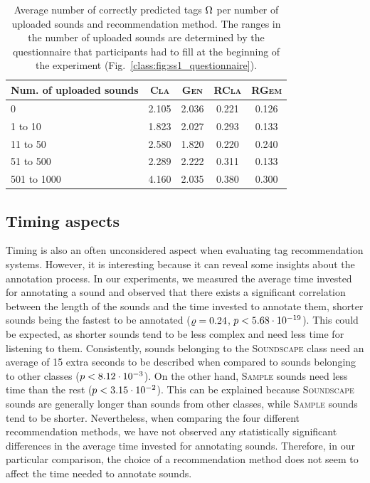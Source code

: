 \begin{table}
\footnotesize
  \begin{center}
\footnotesize
\begin{tabular}{l@{\hskip 1.0cm}cccc}
	\toprule
	 \textbf{Num. of uploaded sounds}	&  \textsc{Cla} & \textsc{Gen} & \textsc{RCla} & \textsc{RGem}  \\ 
	 \midrule
	  0 & 2.105 & 2.036 & 0.221 & 0.126 \\
	  1 to 10 & 1.823 & 2.027 & 0.293 & 0.133 \\
	  11 to 50 & 2.580 & 1.820 & 0.220 & 0.240 \\
	  51 to 500 & 2.289 & 2.222 & 0.311 & 0.133 \\
	  501 to 1000 & 4.160 & 2.035 & 0.380 & 0.300 \\ 
	  \bottomrule

\end{tabular}
\end{center}
\caption[Average number of correctly predicted tags per number of uploaded sounds and recommendation method]{Average number of correctly predicted tags $\Omega$ per number of uploaded sounds and recommendation method. The ranges in the number of uploaded sounds are determined by the questionnaire that participants had to fill at the beginning of the experiment (Fig.~\ref{class:fig:ss1_questionnaire}).}
\label{tab:correlation_uploaded_sounds_at}
\end{table}


\subsection{Timing aspects}
\label{class:sec:timing_results}

Timing is also an often unconsidered aspect when evaluating tag recommendation systems. However, it is interesting because it can reveal some insights about the annotation process. In our experiments, we measured the average time invested for annotating a sound and observed that there exists a significant correlation between the length of the sounds and the time invested to annotate them, shorter sounds being the fastest to be annotated ($\varrho=0.24$, $p<5.68\cdot 10^{-19}$). This could be expected, as shorter sounds tend to be less complex and need less time for listening to them. Consistently, sounds belonging to the \textsc{Soundscape} class need an average of 15 extra seconds to be described when compared to sounds belonging to other classes ($p< 8.12\cdot 10^{-3}$). On the other hand, \textsc{Sample} sounds need less time than the rest ($p < 3.15\cdot 10^{-2}$). This can be explained because \textsc{Soundscape} sounds are generally longer than sounds from other classes, while \textsc{Sample} sounds 
tend to be shorter. Nevertheless, when comparing the four different recommendation methods, we have not observed any statistically significant differences in the average time invested for annotating sounds. Therefore, in our particular comparison, the choice of a recommendation method does not seem to affect the time needed to annotate sounds.

